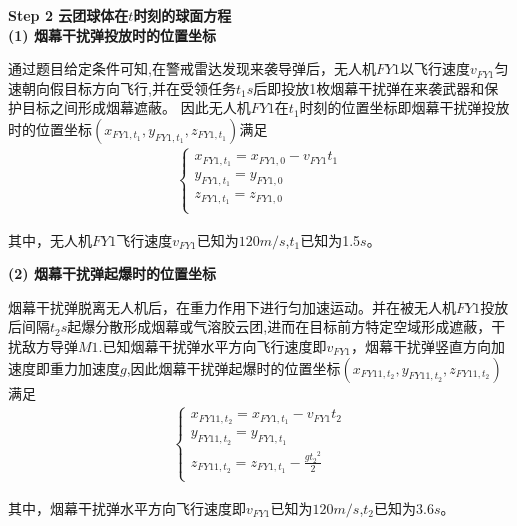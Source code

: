 \documentclass[../main.tex]{subfiles}
\begin{document}
\noindent\textbf{Step 2 云团球体在$t$时刻的球面方程}
\\
\noindent \textbf{(1) 烟幕干扰弹投放时的位置坐标}
\par 通过题目给定条件可知,在警戒雷达发现来袭导弹后，无人机\( FY1 \)以飞行速度\( v_{FY1} \)匀速朝向假目标方向飞行,并在受领任务$t_1s$后即投放1枚烟幕干扰弹在来袭武器和保护目标之间形成烟幕遮蔽。
因此无人机$FY1$在$t_1$时刻的位置坐标即烟幕干扰弹投放时的位置坐标$(x_{FY1,t_1}, y_{FY1,{t_1}}, z_{FY1,{t_1}})$满足
\begin{align}\label{1.8}
    \left\{ \begin{array}{l}
	x_{FY1,{t_1}}=x_{FY1,0}-v_{FY1}{t_1}\\
	y_{FY1,{t_1}}=y_{FY1,0}\\
	z_{FY1,{t_1}}=z_{FY1,0}\\
\end{array} \right. 
\end{align}
\par 其中，无人机$FY1$飞行速度\( v_{FY1} \)已知为$120m/s$,$t_1$已知为1.5$s$。


\noindent\textbf{(2) 烟幕干扰弹起爆时的位置坐标}
\par 烟幕干扰弹脱离无人机后，在重力作用下进行匀加速运动。并在被无人机$FY1$投放后间隔$t_2s$起爆分散形成烟幕或气溶胶云团,进而在目标前方特定空域形成遮蔽，干扰敌方导弹$M1$.已知烟幕干扰弹水平方向飞行速度即\( v_{FY1} \)，烟幕干扰弹竖直方向加速度即重力加速度$g$,因此烟幕干扰弹起爆时的位置坐标$\left( x_{FY11,t_2},y_{FY11,t_2},z_{FY11,t_2} \right)$满足
\begin{align}\label{1.9}
\left\{ \begin{array}{l}
	x_{FY11,{t_2}}=x_{FY1,t_1}-v_{FY1}{t_2} \\
	y_{FY11,{t_2}}=y_{FY1,t_1}\\
	z_{FY11,{t_2}}=z_{FY1,t_1}-\frac{g{t_2} ^2}{2}\\
\end{array} \right. 
\end{align}
\par 其中，烟幕干扰弹水平方向飞行速度即\( v_{FY1} \)已知为$120m/s$,$t_2$已知为3.6$s$。
\end{document}
